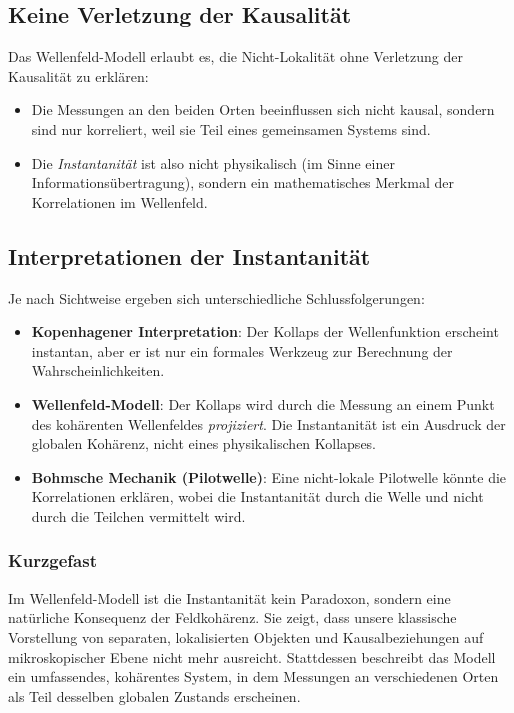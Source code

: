 \documentclass[12pt,a4paper]{article}
\begin{document}
	\subsection{Keine Verletzung der Kausalität}
	
	Das Wellenfeld-Modell erlaubt es, die Nicht-Lokalität ohne Verletzung der Kausalität zu erklären:
	\begin{itemize}
		\item Die Messungen an den beiden Orten beeinflussen sich nicht kausal, sondern sind nur korreliert, weil sie Teil eines gemeinsamen Systems sind.
		\item Die \textit{Instantanität} ist also nicht physikalisch (im Sinne einer Informationsübertragung), sondern ein mathematisches Merkmal der Korrelationen im Wellenfeld.
	\end{itemize}
	
	\subsection{Interpretationen der Instantanität}
	
	Je nach Sichtweise ergeben sich unterschiedliche Schlussfolgerungen:
	\begin{itemize}
		\item \textbf{Kopenhagener Interpretation}: Der Kollaps der Wellenfunktion erscheint instantan, aber er ist nur ein formales Werkzeug zur Berechnung der Wahrscheinlichkeiten.
		\item \textbf{Wellenfeld-Modell}: Der Kollaps wird durch die Messung an einem Punkt des kohärenten Wellenfeldes \textit{projiziert}. Die Instantanität ist ein Ausdruck der globalen Kohärenz, nicht eines physikalischen Kollapses.
		\item \textbf{Bohmsche Mechanik (Pilotwelle)}: Eine nicht-lokale Pilotwelle könnte die Korrelationen erklären, wobei die Instantanität durch die Welle und nicht durch die Teilchen vermittelt wird.
	\end{itemize}
	
	\subsubsection{Kurzgefast}
	
	Im Wellenfeld-Modell ist die Instantanität kein Paradoxon, sondern eine natürliche Konsequenz der Feldkohärenz. Sie zeigt, dass unsere klassische Vorstellung von separaten, lokalisierten Objekten und Kausalbeziehungen auf mikroskopischer Ebene nicht mehr ausreicht. Stattdessen beschreibt das Modell ein umfassendes, kohärentes System, in dem Messungen an verschiedenen Orten als Teil desselben globalen Zustands erscheinen.
\end{document}
